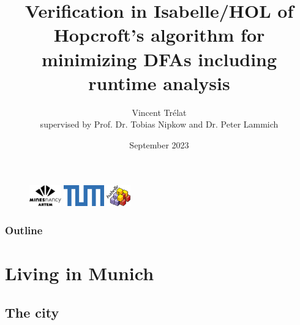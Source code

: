 \documentclass{beamer}
\title[End-of-studies internship]{Verification in Isabelle/HOL of Hopcroft’s algorithm for minimizing DFAs including runtime analysis}
\author[V. Trélat]{
    Vincent Trélat\\
    \small{supervised by Prof. Dr. Tobias Nipkow and Dr. Peter Lammich}
}
\institute[TUM]{Technical University of Munich\\Chair for Logic and Verification}
\date{September 2023}
\theoremstyle{definition}
\begin{document}
\begin{frame}
\begin{figure}
\centering
\hfill
\includegraphics[height=9mm]{../img/logoartem.png}\hfill
\includegraphics[height=9mm]{../img/logoTUM.png}\hfill
\includegraphics[height=9mm]{../img/logoisabelle.png}\hfill
\hfill
\end{figure}
\titlepage
\end{frame}

\begin{frame}
    \frametitle{Outline}
    \tableofcontents
\end{frame}

\section{Living in Munich}
\subsection{The city}
\end{document}
